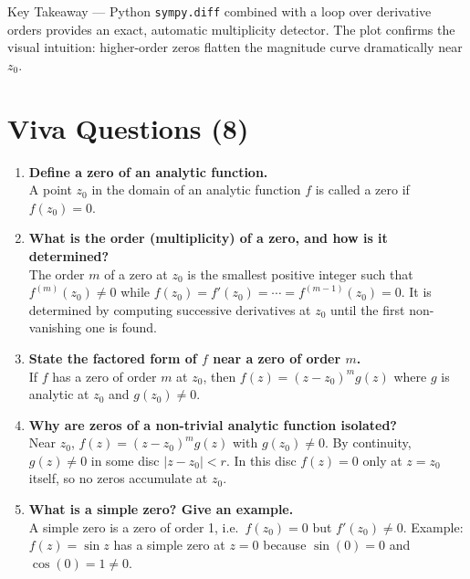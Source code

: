 \documentclass[12pt,a4paper]{article}
\begin{document}
\begin{learnbox}{Key Takeaway --- Python}
\texttt{sympy.diff} combined with a loop over derivative orders provides an exact,
automatic multiplicity detector. The plot confirms the visual intuition: higher-order
zeros flatten the magnitude curve dramatically near $z_0$.
\end{learnbox}

\section{Viva Questions (8)}

\begin{enumerate}[label=\textbf{Q\arabic*.}]

\item \textbf{Define a zero of an analytic function.}\\
A point $z_0$ in the domain of an analytic function $f$ is called a zero if $f(z_0)=0$.

\item \textbf{What is the order (multiplicity) of a zero, and how is it determined?}\\
The order $m$ of a zero at $z_0$ is the smallest positive integer such that $f^{(m)}(z_0)\neq 0$
while $f(z_0)=f'(z_0)=\cdots=f^{(m-1)}(z_0)=0$. It is determined by computing successive
derivatives at $z_0$ until the first non-vanishing one is found.

\item \textbf{State the factored form of $f$ near a zero of order $m$.}\\
If $f$ has a zero of order $m$ at $z_0$, then $f(z)=(z-z_0)^m g(z)$ where $g$ is analytic
at $z_0$ and $g(z_0)\neq 0$.

\item \textbf{Why are zeros of a non-trivial analytic function isolated?}\\
Near $z_0$, $f(z)=(z-z_0)^m g(z)$ with $g(z_0)\neq 0$. By continuity, $g(z)\neq 0$ in some
disc $|z-z_0|<r$. In this disc $f(z)=0$ only at $z=z_0$ itself, so no zeros accumulate at $z_0$.

\item \textbf{What is a simple zero? Give an example.}\\
A simple zero is a zero of order 1, i.e.\ $f(z_0)=0$ but $f'(z_0)\neq 0$. Example: $f(z)=\sin z$
has a simple zero at $z=0$ because $\sin(0)=0$ and $\cos(0)=1\neq 0$.


\end{enumerate}
\end{document}
